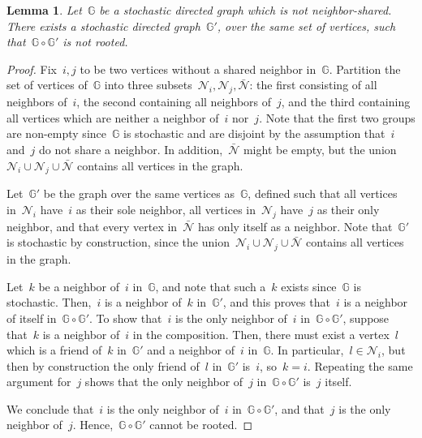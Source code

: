 \documentclass[letterpaper, 10 pt, conference]{ieeeconf}  %
\newtheorem{lemma}{Lemma}
\begin{document}
\begin{lemma}\label{lem:neigh}
    Let~$\mathbb{G}$ be a stochastic directed graph which is not neighbor-shared. There exists a stochastic directed graph~$\mathbb{G}'$, over the same set of vertices, such that~$\mathbb{G} \circ \mathbb{G}'$ is not rooted.
\end{lemma}
\begin{proof}
    Fix~$i,j$ to be two vertices without a shared neighbor in~$\mathbb{G}$. Partition the set of vertices of~$\mathbb{G}$ into three subsets~$\mathcal{N}_i,\mathcal{N}_j,\mathcal{\bar N}$: the first consisting of all neighbors of~$i$, the second containing all neighbors of~$j$, and the third containing all vertices which are neither a neighbor of~$i$ nor~$j$. Note that the first two groups are non-empty since~$\mathbb{G}$ is stochastic and are disjoint by the assumption that~$i$ and~$j$ do not share a neighbor. In addition,~$\mathcal{\bar N}$ might be empty, but the union~~$\mathcal{N}_i \cup \mathcal{N}_j \cup \mathcal{\bar N}$ contains all vertices in the graph.

    Let~$\mathbb{G}'$ be the graph over the same vertices as~$\mathbb{G}$, defined such that all vertices in~$\mathcal{N}_i$ have~$i$ as their sole neighbor, all vertices in~$\mathcal{N}_j$ have~$j$ as their only neighbor, and that every vertex in~$\mathcal{\bar N}$ has only itself as a neighbor. Note that~$\mathbb{G}'$ is stochastic by construction, since the union~$\mathcal{N}_i \cup \mathcal{N}_j \cup \mathcal{\bar N}$ contains all vertices in the graph.
    
    Let~$k$ be a neighbor of~$i$ in~$\mathbb{G}$, and note that such a~$k$ exists since~$\mathbb{G}$ is stochastic. Then,~$i$ is a neighbor of~$k$ in~$\mathbb{G}'$, and this proves that~$i$ is a neighbor of itself in~$\mathbb{G} \circ \mathbb{G}'$. To show that~$i$ is the only neighbor of~$i$ in~$\mathbb{G} \circ \mathbb{G}'$, suppose that~$k$ is a neighbor of~$i$ in the composition. Then, there must exist a vertex~$l$ which is a friend of~$k$ in~$\mathbb{G}'$ and a neighbor of~$i$ in~$\mathbb{G}$. In particular,~$l \in \mathcal{N}_i$, but then by construction the only friend of~$l$ in~$\mathbb{G}'$ is~$i$, so~$k=i$. Repeating the same argument for~$j$ shows that the only neighbor of~$j$ in~$\mathbb{G} \circ \mathbb{G}'$ is~$j$ itself.
    
    We conclude that~$i$ is the only neighbor of~$i$ in~$\mathbb{G} \circ \mathbb{G}'$, and that~$j$ is the only neighbor of~$j$. Hence,~$\mathbb{G} \circ \mathbb{G}'$ cannot be rooted.
\end{proof}
\end{document}
